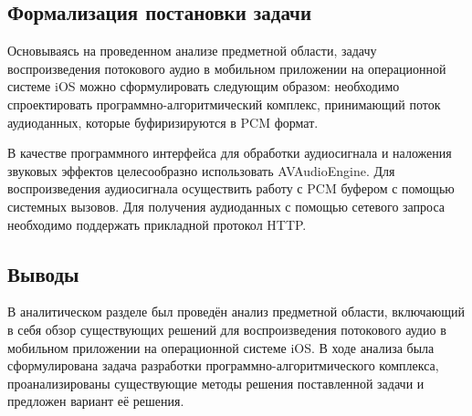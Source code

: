 \subsection{Формализация постановки задачи}
	\par Основываясь на проведенном анализе предметной области, 
	задачу воспроизведения потокового аудио в мобильном приложении на операционной системе iOS
	можно сформулировать следующим образом: необходимо спроектировать программно-алгоритмический комплекс, 
	принимающий поток аудиоданных, которые буфиризируются в PCM формат. 
	
	\par В качестве программного интерфейса для обработки аудиосигнала и наложения звуковых эффектов целесообразно использовать AVAudioEngine.
	Для воспроизведения аудиосигнала осуществить работу с PCM буфером с помощью системных вызовов.
	Для получения аудиоданных с помощью сетевого запроса необходимо поддержать прикладной протокол HTTP.

\subsection*{Выводы}
	В аналитическом разделе был проведён анализ предметной области, 
	включающий в себя обзор существующих решений для воспроизведения потокового аудио в мобильном приложении на операционной системе iOS. 
	В ходе анализа была сформулирована задача разработки программно-алгоритмического комплекса,
	проанализированы существующие методы решения поставленной задачи и предложен вариант её решения.

\pagebreak


